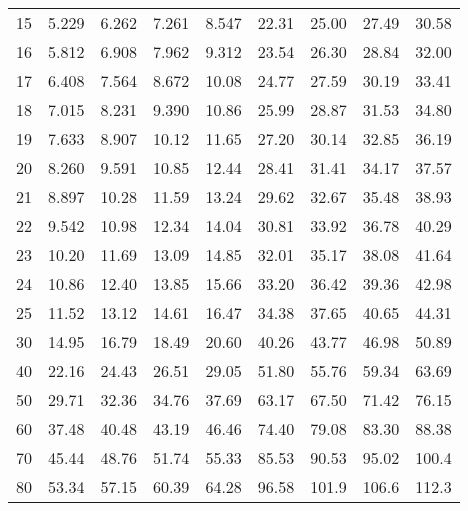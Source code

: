 \documentclass[1pt]{report}
\newcommand{\<}{\langle}
\renewcommand{\>}{\rangle}
\begin{document}
\begin{table}[H]
{{{\begin{tabular}{| l | l l l l l l l l|}
15 & 5.229 & 6.262 & 7.261 & 8.547 & 22.31 & 25.00 & 27.49 & 30.58\\
16 & 5.812 & 6.908 & 7.962 & 9.312 & 23.54 & 26.30 & 28.84 & 32.00\\
17 & 6.408 & 7.564 & 8.672 & 10.08 & 24.77 & 27.59 & 30.19 & 33.41\\
18 & 7.015 & 8.231 & 9.390 & 10.86 & 25.99 & 28.87 & 31.53 & 34.80\\
19 & 7.633 & 8.907 & 10.12 & 11.65 & 27.20 & 30.14 & 32.85 & 36.19\\
20 & 8.260 & 9.591 & 10.85 & 12.44 & 28.41 & 31.41 & 34.17 & 37.57\\ \hline\hline
21 & 8.897 & 10.28 & 11.59 & 13.24 & 29.62 & 32.67 & 35.48 & 38.93\\
22 & 9.542 & 10.98 & 12.34 & 14.04 & 30.81 & 33.92 & 36.78 & 40.29\\
23 & 10.20 & 11.69 & 13.09 & 14.85 & 32.01 & 35.17 & 38.08 & 41.64\\
24 & 10.86 & 12.40 & 13.85 & 15.66 & 33.20 & 36.42 & 39.36 & 42.98\\
25 & 11.52 & 13.12 & 14.61 & 16.47 & 34.38 & 37.65 & 40.65 & 44.31\\
30 & 14.95 & 16.79 & 18.49 & 20.60 & 40.26 & 43.77 & 46.98 & 50.89\\
40 & 22.16 & 24.43 & 26.51 & 29.05 & 51.80 & 55.76 & 59.34 & 63.69\\
50 & 29.71 & 32.36 & 34.76 & 37.69 & 63.17 & 67.50 & 71.42 & 76.15\\
60 & 37.48 & 40.48 & 43.19 & 46.46 & 74.40 & 79.08 & 83.30 & 88.38\\
70 & 45.44 & 48.76 & 51.74 & 55.33 & 85.53 & 90.53 & 95.02 & 100.4\\
80 & 53.34 & 57.15 & 60.39 & 64.28 & 96.58 & 101.9 & 106.6 & 112.3\\ \hline
\end{tabular}}}}
\end{table}
\end{document}
